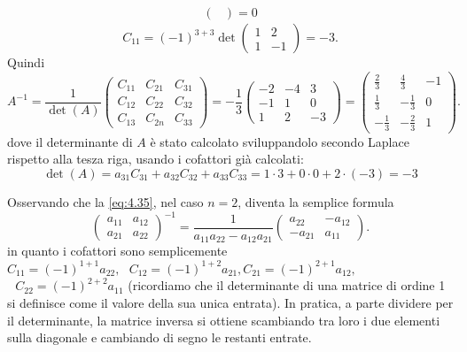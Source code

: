 \begin{esempio}
\begin{eqnarray*}
\begin{pmatrix}
                            \end{pmatrix}=0
  \end{eqnarray*}
  \begin{equation*}
    C_{11}=(-1)^{3+3}\det
    \begin{pmatrix}
      1 & 2 \\
      1 & -1
    \end{pmatrix}
    =-3.
  \end{equation*}
  Quindi
  \begin{equation*}
    A^{-1}=\frac{1}{\det(A)}
    \begin{pmatrix}
      C_{11} & C_{21} & C_{31}\\
      C_{12} & C_{22} & C_{32}\\
      C_{13} & C_{2n} & C_{33}
    \end{pmatrix}=-\frac{1}{3}
    \begin{pmatrix}
      -2 & -4 & 3\\
      -1 & 1 &0\\
      1 & 2 & -3 
    \end{pmatrix} =
    \begin{pmatrix}
      \frac{2}{3} & \frac{4}{3} & -1\\
      \frac{1}{3} & -\frac{1}{3} & 0\\
      -\frac{1}{3} & -\frac{2}{3} & 1
    \end{pmatrix}.
  \end{equation*}
  dove il determinante di $A$ è stato calcolato sviluppandolo secondo Laplace rispetto alla tesza riga, usando i
  cofattori già calcolati:
  \begin{equation*}
    \det (A)=a_{31}C_{31}+a_{32}C_{32} +a_{33}C_{33} = 1\cdot 3 + 0\cdot 0 + 2\cdot (-3)=-3
  \end{equation*}
\end{esempio}
\begin{osservazione}
  Osservando che la \ref{eq:4.35}, nel caso $n=2$, diventa la semplice formula
  \begin{equation}
    \label{eq:4.40}
    \begin{pmatrix}
      a_{11} & a_{12}\\
      a_{21} & a_{22}
    \end{pmatrix}^{-1}=\frac{1}{a_{11}a_{22}-a_{12}a_{21}}
    \begin{pmatrix}
      a_{22} & -a_{12}\\
      -a_{21} & a_{11}
    \end{pmatrix}.
  \end{equation}
  in quanto i cofattori sono semplicemente $C_{11}=(-1)^{1+1}a_{22},\text{ } C_{12}=(-1)^{1+2}a_{21},
  C_{21}=(-1)^{2+1}a_{12},$\\ $\text{ } C_{22}=(-1)^{2+2}a_{11}$ (ricordiamo che il determinante di una matrice di
  ordine 1 si definisce come il valore della sua unica entrata). In pratica, a parte dividere per il
  determinante, la matrice inversa si ottiene scambiando tra loro i due elementi sulla diagonale e cambiando di
  segno le restanti entrate.
\end{osservazione}
